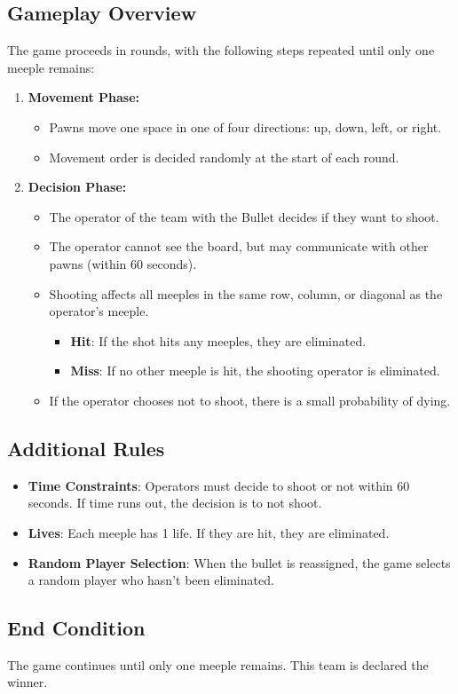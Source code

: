\documentclass[../main.tex]{subfiles}
\begin{document}
\subsection{Gameplay Overview}
The game proceeds in rounds, with the following steps repeated until only one meeple remains:
\begin{enumerate}
    \item \textbf{Movement Phase:}
    \begin{itemize}
        \item Pawns move one space in one of four directions: up, down, left, or right.
        \item Movement order is decided randomly at the start of each round.
    \end{itemize}
    \item \textbf{Decision Phase:}
    \begin{itemize}
        \item The operator of the team with the Bullet decides if they want to shoot.
        \item The operator cannot see the board, but may communicate with other pawns (within 60 seconds).
        \item Shooting affects all meeples in the same row, column, or diagonal as the operator’s meeple.
        \begin{itemize}
            \item \textbf{Hit}: If the shot hits any meeples, they are eliminated.
            \item \textbf{Miss}: If no other meeple is hit, the shooting operator is eliminated.
        \end{itemize}
        \item If the operator chooses not to shoot, there is a small probability of dying.
    \end{itemize}
\end{enumerate}

\subsection{Additional Rules}
\begin{itemize}
    \item \textbf{Time Constraints}: Operators must decide to shoot or not within 60 seconds. If time runs out, the decision is to not shoot.
    \item \textbf{Lives}: Each meeple has 1 life. If they are hit, they are eliminated.
    \item \textbf{Random Player Selection}: When the bullet is reassigned, the game selects a random player who hasn’t been eliminated.
\end{itemize}

\subsection{End Condition}
The game continues until only one meeple remains. This team is declared the winner.
\end{document}
